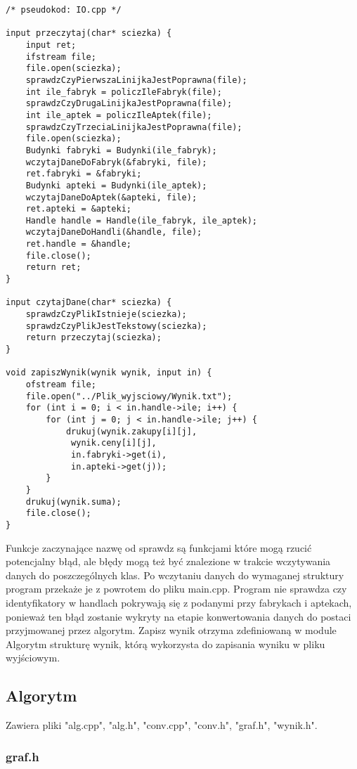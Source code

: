 \documentclass{article}
\begin{document}
\begin{lstlisting}
/* pseudokod: IO.cpp */

input przeczytaj(char* sciezka) {
	input ret;
	ifstream file;
	file.open(sciezka);
	sprawdzCzyPierwszaLinijkaJestPoprawna(file);
	int ile_fabryk = policzIleFabryk(file);
	sprawdzCzyDrugaLinijkaJestPoprawna(file);
	int ile_aptek = policzIleAptek(file);
	sprawdzCzyTrzeciaLinijkaJestPoprawna(file);
	file.open(sciezka);
	Budynki fabryki = Budynki(ile_fabryk);
	wczytajDaneDoFabryk(&fabryki, file);
	ret.fabryki = &fabryki;
	Budynki apteki = Budynki(ile_aptek);
	wczytajDaneDoAptek(&apteki, file);
	ret.apteki = &apteki;
	Handle handle = Handle(ile_fabryk, ile_aptek);
	wczytajDaneDoHandli(&handle, file);
	ret.handle = &handle;
	file.close();
	return ret;
}

input czytajDane(char* sciezka) {
	sprawdzCzyPlikIstnieje(sciezka);
	sprawdzCzyPlikJestTekstowy(sciezka);
	return przeczytaj(sciezka);
}

void zapiszWynik(wynik wynik, input in) {
	ofstream file;
	file.open("../Plik_wyjsciowy/Wynik.txt");
	for (int i = 0; i < in.handle->ile; i++) {
		for (int j = 0; j < in.handle->ile; j++) {
			drukuj(wynik.zakupy[i][j],
			 wynik.ceny[i][j],
			 in.fabryki->get(i),
			 in.apteki->get(j));
		}
	}
	drukuj(wynik.suma);
	file.close();
}
\end{lstlisting}

Funkcje zaczynające nazwę od sprawdz są funkcjami które mogą rzucić potencjalny błąd, ale błędy mogą też być znalezione w trakcie wczytywania danych do poszczególnych klas. Po wczytaniu danych do wymaganej struktury program przekaże je z powrotem do pliku main.cpp. Program nie sprawdza czy identyfikatory w handlach pokrywają się z podanymi przy fabrykach i aptekach, ponieważ ten błąd zostanie wykryty na etapie konwertowania danych do postaci przyjmowanej przez algorytm. Zapisz wynik otrzyma zdefiniowaną w module Algorytm strukturę wynik, którą wykorzysta do zapisania wyniku w pliku wyjściowym.

\subsection{Algorytm}

Zawiera pliki "alg.cpp", "alg.h", "conv.cpp", "conv.h", "graf.h", "wynik.h".

\subsubsection{graf.h}
\end{document}
